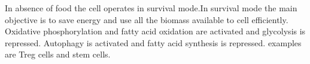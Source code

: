 In absence of food the cell operates in survival mode.In survival mode the main objective is to save energy and use all the biomass available to cell efficiently.
Oxidative phosphorylation and fatty acid oxidation are activated and glycolysis is repressed.
Autophagy is activated and fatty acid synthesis is repressed.
examples are Treg cells and stem cells.